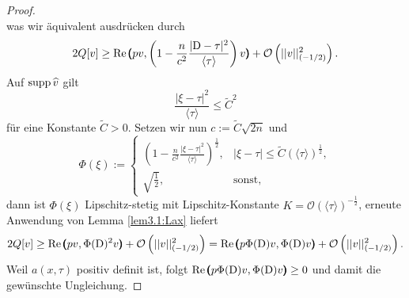 \begin{proof}
\begin{equation}
\end{equation}
was wir äquivalent ausdrücken durch
\begin{equation}
	2Q[v] \ge \operatorname{Re}\pmb(pv,\left(1-\frac{n}{c^2}\frac{| \mathrm D-\tau|^2}{\langle\tau\rangle}\right)v\pmb)+\mathcal{O}\left(|| v||_{\left(-{1}/{2}\right)}^2\right).
\end{equation}
Auf $\operatorname{supp}\widehat{v}$ gilt
\begin{equation}
	\frac{|\xi-\tau|^2}{\langle\tau\rangle}\le \tilde{C}^2 
\end{equation}
für eine Konstante $\tilde{C}>0$. Setzen wir nun $c:=\tilde{C}\sqrt{2n}$ und 
\begin{equation}
	\Phi(\xi):=\begin{cases}
		\left(1-\frac{n}{c^2}\frac{| \xi-\tau|^2}{\langle\tau\rangle}\right)^{\frac{1}{2}}, &| \xi-\tau| \le \tilde C(\langle\tau\rangle)^{\frac{1}{2}},\\
		\sqrt{\frac{1}{2}}, & \text{sonst},
	\end{cases}
\end{equation}
dann ist $\Phi(\xi)$ Lipschitz-stetig mit Lipschitz-Konstante $K=\mathcal O(\langle\tau\rangle)^{-\frac{1}{2}}$, erneute Anwendung von Lemma \ref{lem3.1:Lax} liefert
\begin{equation}
	2Q[v] \ge \operatorname{Re}\pmb(pv,\Phi(\mathrm D)^2v\pmb)+\mathcal{O}\left(|| v||_{\left(-{1}/{2}\right)}^2\right) = \operatorname{Re}\pmb(p\Phi(\mathrm D)v,\Phi(\mathrm D)v\pmb)+\mathcal{O}\left(|| v||_{\left(-{1}/{2}\right)}^2\right).
\end{equation}
Weil $a(x,\tau)$ positiv definit ist, folgt $\operatorname{Re}\pmb(p\Phi(\mathrm D)v,\Phi(\mathrm D)v\pmb)\ge 0$ und damit die gewünschte Ungleichung. 
\end{proof}

